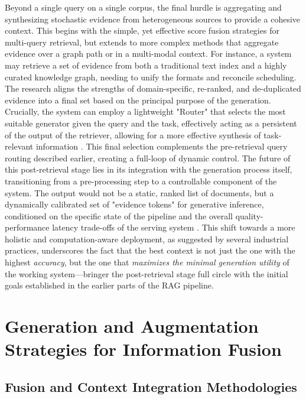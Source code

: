 \documentclass[11pt,a4paper]{article}
\begin{document}
Beyond a single query on a single corpus, the final hurdle is aggregating and synthesizing stochastic evidence from heterogeneous sources to provide a cohesive context. This begins with the simple, yet effective score fusion strategies for multi-query retrieval, but extends to more complex methods that aggregate evidence over a graph path or in a multi-modal context. For instance, a system may retrieve a set of evidence from both a traditional text index and a highly curated knowledge graph, needing to unify the formats and reconcile scheduling. The research aligns the strengths of domain-specific, re-ranked, and de-duplicated evidence into a final set based on the principal purpose of the generation. Crucially, the system can employ a lightweight "Router" that selects the most suitable generator given the query and the task, effectively acting as a persistent of the output of the retriever, allowing for a more effective synthesis of task-relevant information \cite{arxiv:2604.22849v1} \cite{arxiv:2602.00296v2}. This final selection complements the pre-retrieval query routing described earlier, creating a full-loop of dynamic control. The future of this post-retrieval stage lies in its integration with the generation process itself, transitioning from a pre-processing step to a controllable component of the system. The output would not be a static, ranked list of documents, but a dynamically calibrated set of "evidence tokens" for generative inference, conditioned on the specific state of the pipeline and the overall quality-performance latency trade-offs of the serving system \cite{arxiv:2608.03487v1}. This shift towards a more holistic and computation-aware deployment, as suggested by several industrial practices, underscores the fact that the best context is not just the one with the highest \emph{accuracy}, but the one that \emph{maximizes the minimal generation utility} of the working system---bringer the post-retrieval stage full circle with the initial goals established in the earlier parts of the RAG pipeline.


\section{Generation and Augmentation Strategies for Information Fusion}



\subsection{Fusion and Context Integration Methodologies}
\end{document}
